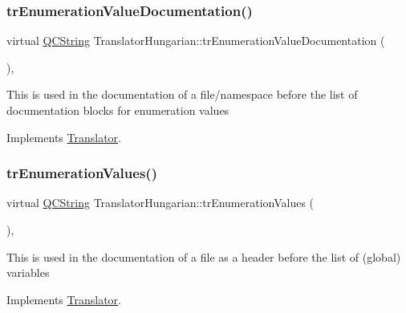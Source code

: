 \mbox{\label{class_translator_hungarian_a11ea2035201831f5e1dd4a26f356a589}} 
\subsubsection{\texorpdfstring{trEnumerationValueDocumentation()}{trEnumerationValueDocumentation()}}
{\footnotesize\ttfamily virtual \mbox{\hyperlink{class_q_c_string}{Q\+C\+String}} Translator\+Hungarian\+::tr\+Enumeration\+Value\+Documentation (\begin{DoxyParamCaption}{ }\end{DoxyParamCaption})\hspace{0.3cm}{\ttfamily [inline]}, {\ttfamily [virtual]}}

This is used in the documentation of a file/namespace before the list of documentation blocks for enumeration values 

Implements \mbox{\hyperlink{class_translator}{Translator}}.

\mbox{\label{class_translator_hungarian_ace8d0b13ae2aea6988528d4dea2c2f76}} 
\subsubsection{\texorpdfstring{trEnumerationValues()}{trEnumerationValues()}}
{\footnotesize\ttfamily virtual \mbox{\hyperlink{class_q_c_string}{Q\+C\+String}} Translator\+Hungarian\+::tr\+Enumeration\+Values (\begin{DoxyParamCaption}{ }\end{DoxyParamCaption})\hspace{0.3cm}{\ttfamily [inline]}, {\ttfamily [virtual]}}

This is used in the documentation of a file as a header before the list of (global) variables 

Implements \mbox{\hyperlink{class_translator}{Translator}}.

\mbox{\label{class_translator_hungarian_a515216f8c3ed33b0b55686c579698d33}} 
